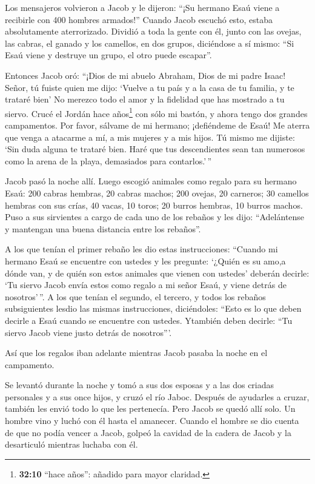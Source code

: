  Los mensajeros volvieron a Jacob y le dijeron: ``¡Su
hermano Esaú viene a recibirle con 400 hombres armados!'' 
Cuando Jacob escuchó esto, estaba absolutamente aterrorizado. Dividió a
toda la gente con él, junto con las ovejas, las cabras, el ganado y los
camellos, en dos grupos,  diciéndose a sí mismo: ``Si Esaú
viene y destruye un grupo, el otro puede escapar''.

 Entonces Jacob oró: ``¡Dios de mi abuelo Abraham, Dios de
mi padre Isaac! Señor, tú fuiste quien me dijo: `Vuelve a tu país y a la
casa de tu familia, y te trataré bien'  No merezco todo el
amor y la fidelidad que has mostrado a tu siervo. Crucé el Jordán hace
años\footnote{\textbf{32:10} ``hace años'': añadido para mayor claridad.}
con sólo mi bastón, y ahora tengo dos grandes campamentos. 
Por favor, sálvame de mi hermano; ¡defiéndeme de Esaú! Me aterra que
venga a atacarme a mí, a mis mujeres y a mis hijos.  Tú
mismo me dijiste: `Sin duda alguna te trataré bien. Haré que tus
descendientes sean tan numerosos como la arena de la playa, demasiados
para contarlos.'\,''

 Jacob pasó la noche allí. Luego escogió animales como
regalo para su hermano Esaú:  200 cabras hembras, 20 cabras
machos; 200 ovejas, 20 carneros;  30 camellos hembras con
sus crías, 40 vacas, 10 toros; 20 burros hembras, 10 burros machos.
 Puso a sus sirvientes a cargo de cada uno de los rebaños y
les dijo: ``Adelántense y mantengan una buena distancia entre los
rebaños''.

 A los que tenían el primer rebaño les dio estas
instrucciones: ``Cuando mi hermano Esaú se encuentre con ustedes y les
pregunte: `¿Quién es su amo,a dónde van, y de quién son estos animales
que vienen con ustedes'  deberán decirle: `Tu siervo Jacob
envía estos como regalo a mi señor Esaú, y viene detrás de
nosotros'\,''.  A los que tenían el segundo, el tercero, y
todos los rebaños subsiguientes lesdio las mismas instrucciones,
diciéndoles: ``Esto es lo que deben decirle a Esaú cuando se encuentre
con ustedes.  Ytambién deben decirle: ``Tu siervo Jacob
viene justo detrás de nosotros'''.

 Así que los regalos iban adelante mientras Jacob pasaba la
noche en el campamento.

 Se levantó durante la noche y tomó a sus dos esposas y a
las dos criadas personales y a sus once hijos, y cruzó el río Jaboc.
 Después de ayudarles a cruzar, también les envió todo lo
que les pertenecía.  Pero Jacob se quedó allí solo. Un
hombre vino y luchó con él hasta el amanecer.  Cuando el
hombre se dio cuenta de que no podía vencer a Jacob, golpeó la cavidad
de la cadera de Jacob y la desarticuló mientras luchaba con él.


